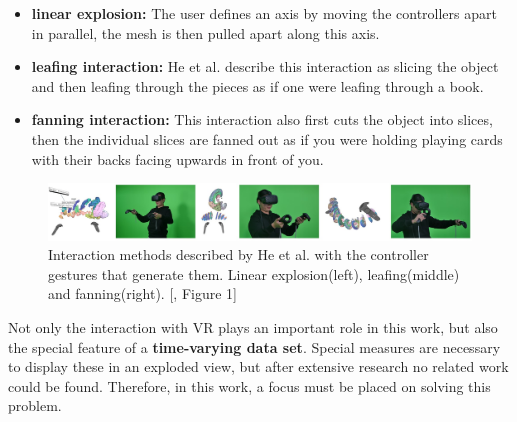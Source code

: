 \begin{itemize}
	\item \textbf{linear explosion:} The user defines an axis by moving the controllers apart in parallel, the mesh is then pulled apart along this axis.
	\item \textbf{leafing interaction:} He et al. describe this interaction as slicing the object and then leafing through the pieces as if one were leafing through a book.
	\item \textbf{fanning interaction:} This interaction also first cuts the object into slices, then the individual slices are fanned out as if you were holding playing cards with their backs facing upwards in front of you. 
\end{itemize}

\begin{figure}[h]
	\centering
	\includegraphics[width=1\linewidth]{fig/Images/He_fig1}
	\caption[]{Interaction methods described by He et al. with the controller gestures that generate them. Linear explosion(left), leafing(middle) and fanning(right). [\cite{He2017}, Figure 1]}
\end{figure}
Not only the interaction with VR plays an important role in this work, but also the special feature of a \textbf{time-varying data set}. 
Special measures are necessary to display these in an exploded view, but after extensive research no related work could be found. 
Therefore, in this work, a focus must be placed on solving this problem.

